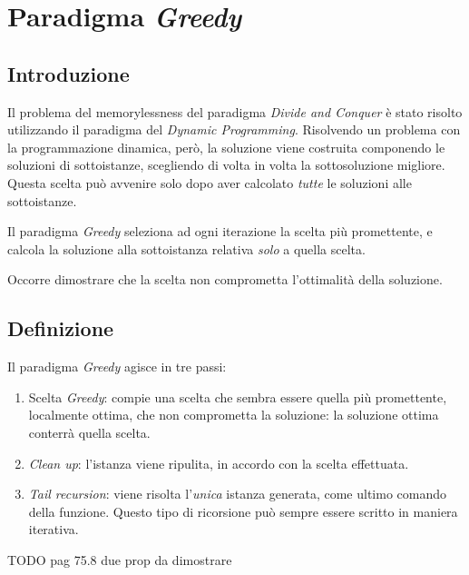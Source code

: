 \section{Paradigma \emph{Greedy}}

\subsection{Introduzione}

Il problema del memorylessness del paradigma \emph{Divide and Conquer} è stato risolto utilizzando il paradigma del \emph{Dynamic Programming}. Risolvendo un problema con la programmazione dinamica, però, la soluzione viene costruita componendo le soluzioni di sottoistanze, scegliendo di volta in volta la sottosoluzione migliore. Questa scelta può avvenire solo dopo aver calcolato \emph{tutte} le soluzioni alle sottoistanze.

Il paradigma \emph{Greedy} seleziona ad ogni iterazione la scelta più promettente, e calcola la soluzione alla sottoistanza relativa \emph{solo} a quella scelta.

Occorre dimostrare che la scelta non comprometta l'ottimalità della soluzione.

\subsection{Definizione}

Il paradigma \emph{Greedy} agisce in tre passi:
\begin{enumerate}
    \item Scelta \emph{Greedy}: compie una scelta che sembra essere quella più promettente, localmente ottima, che non comprometta la soluzione: la soluzione ottima conterrà quella scelta.
    \item \emph{Clean up}: l'istanza viene ripulita, in accordo con la scelta effettuata.
    \item \emph{Tail recursion}: viene risolta l'\emph{unica} istanza generata, come ultimo comando della funzione. Questo tipo di ricorsione può sempre essere scritto in maniera iterativa.
\end{enumerate}

TODO pag 75.8 due prop da dimostrare

